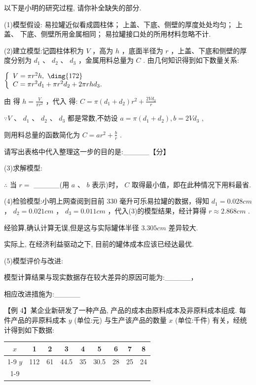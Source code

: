 以下是小明的研究过程, 请你补全缺失的部分.

(1)模型假设:  易拉罐近似看成圆柱体；  上盖、下底、侧壁的厚度处处均匀；  上盖、 下底、侧壁所用金属相同；  易拉罐接口处的所用材料忽略不计.

(2)建立模型:记圆柱体积为 $V$ ，高为 $h$ ，底面半径为 $r$ ，上盖、下底和侧壁的厚度分别为 ${d}_{1}$ 、 ${d}_{2}$ 、 ${d}_{3}$ ，金属用料总量为 $C$ . 由几何知识得到如下数量关系:

$\left\{  \begin{array}{l} V = \pi {r}^{2}h,\text{  \ding{172}  } \\  C = \pi {r}^{2}{d}_{1} + \pi {r}^{2}{d}_{2} + {2\pi rh}{d}_{3}. \end{array}\right.$

由    得 $h = \frac{V}{\pi {r}^{2}}$ ，代入    得: $C = \pi \left( {{d}_{1} + {d}_{2}}\right) {r}^{2} + \frac{{2V}{d}_{3}}{r}$

$\because V\text{ 、 }{d}_{1}\text{ 、 }{d}_{2}\text{ 、 }{d}_{3}$ 都是常数,不妨设 $a = \pi \left( {{d}_{1} + {d}_{2}}\right) ,b = {2V}{d}_{3}$ ,

则用料总量的函数简化为 $C = a{r}^{2} + \frac{b}{r}$ .

请写出表格中代入整理这一步的目的是:\_\_\_\_\_【分】

(3)求解模型:

$\therefore$ 当 $r =$ \_\_\_\_\_(用 $a\text{ 、 }b$ 表示)时， $C$ 取得最小值，即在此种情况下用料最省.

(4)检验模型:小明上网查阅到目前 330 毫升可乐易拉罐的数据，得知 ${d}_{1} = {0.028}{{cm}}$ ， ${d}_{2} = {0.021}{{cm}}$ ， ${d}_{3} = {0.011}{{cm}}$ ，代入(3)的模型结果，经计算得 $r \approx  {2.868}{{cm}}$ .

经验算,确认计算无误,但是这与实际罐体半径 ${3.305}{{cm}}$ 差异较大.

实际上, 在经济利益驱动之下, 目前的罐体成本应该已经达最优.

(5)模型评价与改进:

模型计算结果与现实数据存在较大差异的原因可能为:\_\_\_\_\_，

相应改进措施为:\_\_\_\_\_

【例 4】某企业新研发了一种产品, 产品的成本由原料成本及非原料成本组成. 每件产品的非原料成本 $y$ (单位:元) 与生产该产品的数量 $x$ (单位:千件) 有关，经统计得到如下数据:

\begin{center}
\begin{tabular}{|c|c|c|c|c|c|c|c|c|}
\hline
$x$ & 1 & 2 & 3 & 4 & 5 & 6 & 7 & 8 \\
\cline{1-9}
$y$ & 112 & 61 & 44.5 & 35 & 30.5 & 28 & 25 & 24 \\
\cline{1-9}
\hline
\end{tabular}
\end{center}

